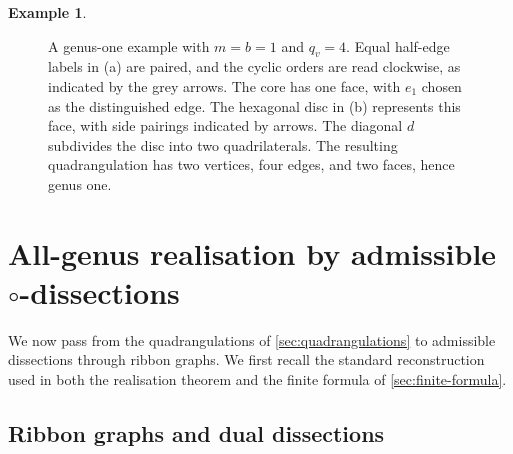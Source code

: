 \documentclass[11pt]{amsart}
\theoremstyle{definition}
\theoremstyle{plain}
\theoremstyle{definition}
\newtheorem{example}[example]{Example}
\theoremstyle{definition}
\begin{document}
\begin{example}
\begin{figure}[htbp]
\caption{A genus-one example with $m=b=1$ and $q_v=4$.
Equal half-edge labels in \textup{(a)} are paired, and the cyclic
orders are read clockwise, as indicated by the grey arrows.
The core has one face, with $e_1$ chosen as the distinguished edge.
The hexagonal disc in \textup{(b)} represents this face, with side
pairings indicated by arrows. The diagonal $d$ subdivides the disc
into two quadrilaterals. The resulting quadrangulation has two
vertices, four edges, and two faces, hence genus one.}
\label{fig:core-to-quadrangulation}
\end{figure}
\end{example}

\section{All-genus realisation by admissible \texorpdfstring{$\circ$}{o}-dissections}
\label{sec:arc-realization}

We now pass from the quadrangulations of
\cref{sec:quadrangulations} to admissible dissections through
ribbon graphs.  We first recall the standard reconstruction
used in both the realisation theorem and the finite formula
of \cref{sec:finite-formula}.
\subsection{Ribbon graphs and dual dissections}
\label{subsec:ribbon-reconstruction}
\end{document}
